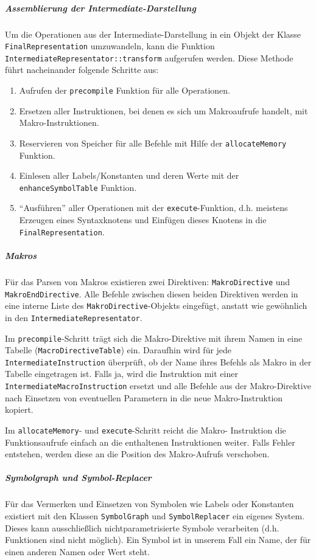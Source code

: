 \subparagraph{Assemblierung der Intermediate-Darstellung}
\label{sec:dev_parser_assem_inter}
Um die Operationen aus der Intermediate-Darstellung in ein Objekt der Klasse
\texttt{FinalRepresentation} umzuwandeln, kann die Funktion
\texttt{IntermediateRepresentator::\allowbreak{}transform} aufgerufen werden.
Diese Methode führt nacheinander folgende Schritte aus:

\begin{enumerate}
	\item Aufrufen der \texttt{precompile} Funktion für alle Operationen.
	\item Ersetzen aller Instruktionen, bei denen es sich um Makroaufrufe
	handelt, mit Makro-Instruktionen.
	\item Reservieren von Speicher für alle Befehle mit Hilfe der
	\texttt{allocateMemory} Funktion.
	\item Einlesen aller Labels/Konstanten und deren Werte mit der
	\texttt{enhanceSymbolTable} Funktion.
	\item "`Ausführen"' aller Operationen mit der \texttt{execute}-Funktion,
	d.h. meistens Erzeugen eines Syntaxknotens und Einfügen dieses Knotens in
	die \texttt{FinalRepresentation}.
\end{enumerate}

\subparagraph{Makros}
Für das Parsen von Makros existieren zwei Direktiven: \texttt{Makro\-Directive}
und \texttt{Makro\-End\-Directive}. Alle Befehle zwischen diesen beiden
Direktiven werden in eine interne Liste des \texttt{Makro\-Directive}-Objekts
eingefügt, anstatt wie gewöhnlich in den \texttt{Intermediate\-Representator}.

Im \texttt{precompile}-Schritt trägt sich die Makro-Direktive mit ihrem Namen
in eine Tabelle (\texttt{Macro\-Directive\-Table}) ein. Daraufhin wird für jede
\texttt{Intermediate\-Instruction} überprüft, ob der Name ihres Befehls als
Makro in der Tabelle eingetragen ist. Falls ja, wird die Instruktion mit einer
\texttt{Intermediate\-Macro\-Instruction} ersetzt und alle Befehle aus der
Makro-Direktive nach Einsetzen von eventuellen Parametern in die neue
Makro-Instruktion kopiert.

Im \texttt{allocateMemory}- und \texttt{execute}-Schritt reicht die Makro-
Instruktion die Funktionsaufrufe einfach an die enthaltenen Instruktionen
weiter. Falls Fehler entstehen, werden diese an die Position des Makro-Aufrufs
verschoben.

\subparagraph{Symbolgraph und Symbol-Replacer}
Für das Vermerken und Einsetzen von Symbolen wie Labels oder Konstanten existiert mit den Klassen \texttt{SymbolGraph} und \texttt{SymbolReplacer} ein eigenes System. Dieses kann ausschließlich nichtparametrisierte Symbole verarbeiten (d.h. Funktionen sind nicht möglich). Ein Symbol ist in unserem Fall ein Name, der für einen anderen Namen oder Wert steht.

